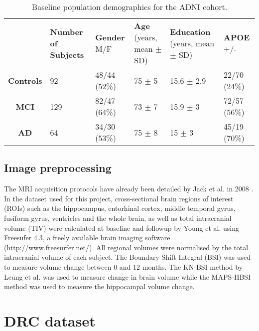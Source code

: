 \begin{table}
\centering
\begin{tabular}{ c |C{1.7cm} | C{1.7cm} | C{2.5cm} | C{2.5cm} | C{1.7cm}} 
& \textbf{Number of Subjects} & \textbf{Gender} \hspace{1cm} M/F & \textbf{Age} \hspace{1cm} (years, mean $\pm$ SD) & \textbf{Education} (years, mean $\pm$ SD) & \textbf{APOE} \hspace{1cm} +/-\\
\textbf{Controls} & 92 & 48/44 (52\%) & 75 $\pm$ 5 & 15.6 $\pm$ 2.9 & 22/70 (24\%)\\ 
\textbf{MCI} & 129 & 82/47 (64\%) & 73 $\pm$ 7 & 15.9 $\pm$ 3 & 72/57 (56\%)\\ 
\textbf{AD} & 64 & 34/30 (53\%) & 75 $\pm$ 8 & 15 $\pm$ 3 & 45/19 (70\%)\\ 
\end{tabular}
\caption[Baseline population demographics for ADNI data]{Baseline population demographics for the ADNI cohort.}
\label{tab:adni_demographics}
\end{table}

\subsection{Image preprocessing}

The MRI acquisition protocols have already been detailed by Jack et al. in 2008 \cite{jack2008alzheimer}. In the dataset used for this project, cross-sectional brain regions of interest (ROIs) such as the hippocampus, entorhinal cortex, middle temporal gyrus, fusiform gyrus, ventricles and the whole brain, as well as total intracranial volume (TIV) were calculated at baseline and followup by Young et al.  \cite{young2014data} using Freesufer 4.3, a freely available brain imaging software (\url{http://www.freesurfer.net/}). All regional volumes were normalised by the total intracranial volume of each subject. The Boundary Shift Integral (BSI) \cite{freeborough1997boundary} was used to measure volume change between 0 and 12 months. The KN-BSI method by Leung et al. \cite{leung2010robust} was used to measure change in brain volume while the MAPS-HBSI method \cite{leung2010automated} was used to measure the hippocampal volume change. 

\section{DRC dataset}
\label{sec:data_drc}

